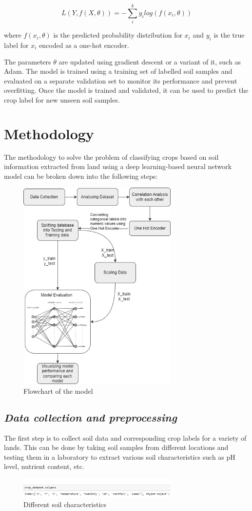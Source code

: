 \documentclass[conference]{IEEEtran}
\begin{document}
\[L(Y, f(X, \theta)) = -\sum_i^k y_{i} log(f(x_{i}, \theta))\]

where $f(x_i, \theta)$ is the predicted probability distribution for $x_i$ and $y_i$ is the true label for $x_i$ encoded as a one-hot encoder.

The parameters $\theta$ are updated using gradient descent or a variant of it, such as Adam. The model is trained using a training set of labelled soil samples and evaluated on a separate validation set to monitor its performance and prevent overfitting. Once the model is trained and validated, it can be used to predict the crop label for new unseen soil samples.

\section{Methodology}
The methodology to solve the problem of classifying crops based on soil information extracted from land using a deep learning-based neural network model can be broken down into the following steps:

\begin{figure}[h!]
    \includegraphics[width = 8cm] {flowchart.drawio (1).png}
    \caption{Flowchart of the model}
    \label{fig:Flowchart of the model}
\end{figure}

\subsection{\emph{\textbf{Data collection and preprocessing}}}
The first step is to collect soil data and corresponding crop labels for a variety of lands. This can be done by taking soil samples from different locations and testing them in a laboratory to extract various soil characteristics such as pH level, nutrient content, etc.
\begin{figure}[h!]
    \centering
    \includegraphics[width = 8cm] {columns.png}
    \caption{Different soil characteristics}
    \label{fig:Different soil characteristics}
\end{figure}
\end{document}
